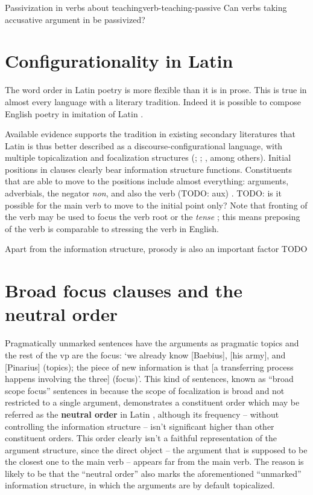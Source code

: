\documentclass[a4paper, oneside, 12pt]{report}
\newcommand*{\citesec}[1]{\S~{#1}}
\newcommand*{\citepage}[1]{p.~{#1}}
\newcommand*{\concept}[1]{\textbf{#1}}
\newcommand{\form}[1]{\emph{#1}}
\newcommand{\translate}[1]{`#1'}
\begin{document}
\begin{todobox}{Passivization in verbs about teaching}{verb-teaching-passive}
    Can verbs taking accusative argument in \citep[\citesec{4.36}]{Pinkster1}
    be passivized?
\end{todobox}

\section{Configurationality in Latin}

The word order in Latin poetry is more flexible than it is in prose.
This is true in almost every language with a literary tradition.
Indeed it is possible to compose English poetry in imitation of Latin \citep[\citesec{600}]{allen1903allen}.

Available evidence supports the tradition in existing secondary literatures that
Latin is thus better described as a discourse-configurational language,
with multiple topicalization and focalization structures
(\citealt[\citepage{189}]{oniga2014latin}; 
\citealt[\citepage{77}]{danckaert2017development}; 
\citealt{devine2006latin}, among others).
Initial positions in clauses clearly bear information structure functions. 
Constituents that are able to move to the positions 
include almost everything: 
arguments, adverbials, the negator \form{non}, 
and also the verb (TODO: aux) 
\citep[\citesec{598}]{allen1903allen}. 
TODO: is it possible for the main verb to move to the initial point only?
Note that fronting of the verb may be used 
to focus the verb root or the \emph{tense}
\citep[\citepage{397}]{allen1903allen};
this means preposing of the verb is comparable to 
stressing the verb in English.

Apart from the information structure, 
prosody is also an important factor TODO

\section{Broad focus clauses and the neutral order}

Pragmatically unmarked sentences have the arguments as pragmatic topics 
and the rest of the \acs{vp} are the focus:
\translate{we already know [Baebius], [his army], and [Pinarius] (topics);
the piece of new information is that 
[a transferring process happens involving the three] (focus)}.
This kind of sentences, known as ``broad scope focus'' sentences 
in \citet[\citepage{15}]{devine2006latin}
because the scope of focalization is broad
and not restricted to a single argument,
demonstrates a constituent order which may be referred as the \concept{neutral order} in Latin
\citep[\citepage{79}]{devine2006latin},
although its frequency -- without controlling the information structure -- 
isn't significant higher than other constituent orders.
This order clearly isn't a faithful representation 
of the argument structure, 
since the direct object -- the argument that is supposed to be the closest one to the main verb -- 
appears far from the main verb. 
The reason is likely to be that the ``neutral order'' also marks 
the aforementioned ``unmarked'' information structure, 
in which the arguments are by default topicalized.
\end{document}
